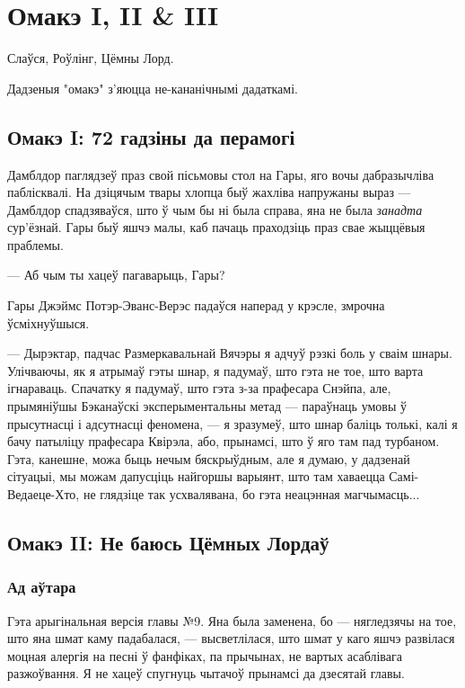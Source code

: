 \chapter{Омакэ I, II \& III}

\begin{chapterOpeningAuthorNote}
Слаўся, Роўлінг, Цёмны Лорд.

Дадзеныя "омакэ" з'яюцца не-кананічнымі дадаткамі.
\end{chapterOpeningAuthorNote}

\section{Омакэ I: 72 гадзіны да перамогі}

Дамблдор паглядзеў праз свой пісьмовы стол на Гары, яго вочы дабразычліва 
паблісквалі. На дзіцячым твары хлопца быў жахліва напружаны выраз --- Дамблдор 
спадзяваўся, што ў чым бы ні была справа, яна не была \emph{занадта} сур'ёзнай.
Гары быў яшчэ малы, каб пачаць праходзіць праз свае жыццёвыя праблемы.

--- Аб чым ты хацеў пагаварыць, Гары?

Гары Джэймс Потэр-Эванс-Верэс падаўся наперад у крэсле, змрочна ўсміхнуўшыся.

--- Дырэктар, падчас Размеркавальнай Вячэры я адчуў рэзкі боль у сваім шнары. 
Улічваючы, як я атрымаў гэты шнар, я падумаў, што гэта не тое, што варта 
ігнараваць. Спачатку я падумаў, што гэта з-за прафесара Снэйпа, але, прымяніўшы 
Бэканаўскі эксперыментальны метад --- параўнаць умовы ў прысутнасці і адсутнасці
феномена, --- я зразумеў, што шнар баліць толькі, калі я бачу патыліцу прафесара 
Квірэла, або, прынамсі, што ў яго там пад турбаном. Гэта, канешне, можа быць 
нечым бяскрыўдным, але я думаю, у дадзенай сітуацыі, мы можам дапусціць найгоршы
варыянт, што там хаваецца Самі-Ведаеце-Хто, не глядзіце так усхвалявана, бо 
гэта неацэнная магчымасць...




\section{Омакэ II: Не баюсь Цёмных Лордаў}

\subsection{Ад аўтара}


Гэта арыгінальная версія главы №9. Яна была заменена, бо --- нягледзячы на тое,
што яна шмат каму  падабалася, --- высветлілася, што шмат у каго яшчэ развілася
моцная алергія на песні ў фанфіках, па прычынах, не вартых асаблівага разжоўвання.
Я не хацеў спугнуць чытачоў прынамсі да дзесятай главы.

